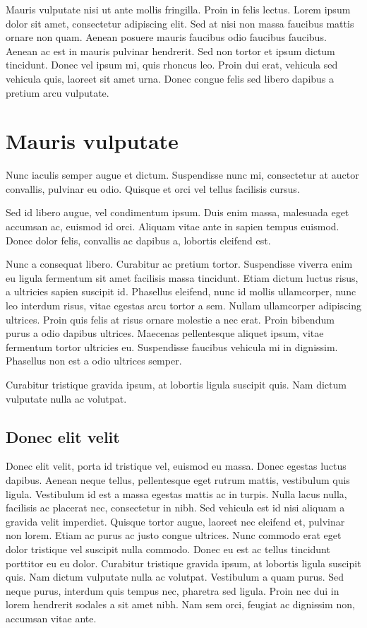Mauris vulputate nisi ut ante mollis fringilla. Proin in felis lectus. Lorem ipsum dolor sit amet, consectetur adipiscing elit. Sed at nisi non massa faucibus mattis ornare non quam. Aenean posuere mauris faucibus odio faucibus faucibus. Aenean ac est in mauris pulvinar hendrerit. Sed non tortor et ipsum dictum tincidunt. Donec vel ipsum mi, quis rhoncus leo. Proin dui erat, vehicula sed vehicula quis, laoreet sit amet urna. Donec congue felis sed libero dapibus a pretium arcu vulputate. 

\section{Mauris vulputate}

Nunc iaculis semper augue et dictum. Suspendisse nunc mi, consectetur at auctor convallis, pulvinar eu odio. Quisque et orci vel tellus facilisis cursus. 

Sed id libero augue, vel condimentum ipsum. Duis enim massa, malesuada eget accumsan ac, euismod id orci. Aliquam vitae ante in sapien tempus euismod. Donec dolor felis, convallis ac dapibus a, lobortis eleifend est. 

Nunc a consequat libero. Curabitur ac pretium tortor. Suspendisse viverra enim eu ligula fermentum sit amet facilisis massa tincidunt. Etiam dictum luctus risus, a ultricies sapien suscipit id. Phasellus eleifend, nunc id mollis ullamcorper, nunc leo interdum risus, vitae egestas arcu tortor a sem. Nullam ullamcorper adipiscing ultrices. Proin quis felis at risus ornare molestie a nec erat. Proin bibendum purus a odio dapibus ultrices. Maecenas pellentesque aliquet ipsum, vitae fermentum tortor ultricies eu. Suspendisse faucibus vehicula mi in dignissim. Phasellus non est a odio ultrices semper.

Curabitur tristique gravida ipsum, at lobortis ligula suscipit quis. Nam dictum vulputate nulla ac volutpat.

\subsection{Donec elit velit}

Donec elit velit, porta id tristique vel, euismod eu massa. Donec egestas luctus dapibus. Aenean neque tellus, pellentesque eget rutrum mattis, vestibulum quis ligula. Vestibulum id est a massa egestas mattis ac in turpis. Nulla lacus nulla, facilisis ac placerat nec, consectetur in nibh. Sed vehicula est id nisi aliquam a gravida velit imperdiet. Quisque tortor augue, laoreet nec eleifend et, pulvinar non lorem. Etiam ac purus ac justo congue ultrices. Nunc commodo erat eget dolor tristique vel suscipit nulla commodo. Donec eu est ac tellus tincidunt porttitor eu eu dolor. Curabitur tristique gravida ipsum, at lobortis ligula suscipit quis. Nam dictum vulputate nulla ac volutpat. Vestibulum a quam purus. Sed neque purus, interdum quis tempus nec, pharetra sed ligula. Proin nec dui in lorem hendrerit sodales a sit amet nibh. Nam sem orci, feugiat ac dignissim non, accumsan vitae ante. 

